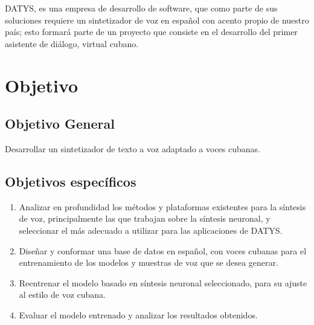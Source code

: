 DATYS, es una empresa de desarrollo de software, que como parte de sus soluciones requiere un sintetizador de voz en español con acento propio de nuestro país; esto formará parte de un proyecto que consiste en el desarrollo del primer asistente de diálogo, virtual cubano. 

\section*{Objetivo}

\subsection*{Objetivo General}

Desarrollar un sintetizador de texto a voz adaptado a voces cubanas.

\subsection*{Objetivos específicos}
\begin{enumerate}
	\item Analizar en profundidad los métodos y plataformas existentes para la síntesis de voz, principalmente las que trabajan sobre la síntesis neuronal, y seleccionar el más adecuado a utilizar para las aplicaciones de DATYS.
	\item Diseñar y conformar una base de datos en español, con voces cubanas para el entrenamiento de los modelos y muestras de voz que se desea generar.
	\item Reentrenar el modelo basado en síntesis neuronal seleccionado, para su ajuste al estilo de voz cubana.
	\item Evaluar el modelo entrenado y analizar los resultados obtenidos.
\end{enumerate}